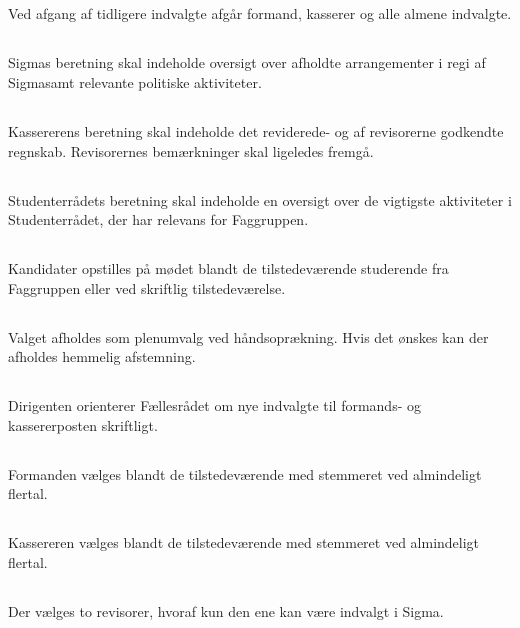 \documentclass[danish,a4paper,twocolumn]{article}
\newcommand{\foreningen}{Sigma}
\begin{document}
\subsection{} Ved afgang af tidligere indvalgte afgår formand, kasserer og alle almene indvalgte.
\subsection{}\foreningen s beretning skal indeholde oversigt over afholdte arrangementer i regi af \foreningen samt relevante politiske aktiviteter.
\subsection{}Kassererens beretning skal indeholde det reviderede- og af revisorerne godkendte regnskab. Revisorernes bemærkninger skal ligeledes fremgå.
\subsection{}Studenterrådets beretning skal indeholde en oversigt over de vigtigste aktiviteter i Studenterrådet, der har relevans for Faggruppen.
\subsection{}Kandidater opstilles på mødet blandt de tilstedeværende studerende fra Faggruppen eller ved skriftlig tilstedeværelse.
\subsection{}Valget afholdes som plenumvalg ved håndsoprækning. Hvis det ønskes kan der afholdes hemmelig afstemning.
\subsection{}Dirigenten orienterer Fællesrådet om nye indvalgte til formands- og kassererposten skriftligt.
\subsection{}\label{stk:Formanden}Formanden vælges blandt de tilstedeværende med stemmeret ved almindeligt flertal. 
\subsection{}Kassereren vælges blandt de tilstedeværende med stemmeret ved almindeligt flertal.
\subsection{}\label{stk:revisorer}Der vælges to revisorer, hvoraf kun den ene kan være indvalgt i \foreningen.
\end{document}
